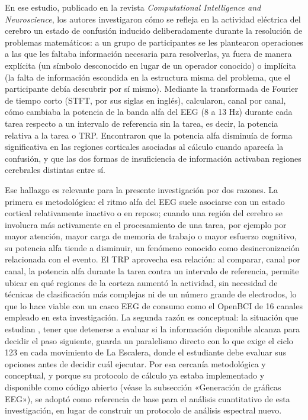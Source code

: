 \documentclass{book}
\begin{document}
En ese estudio, publicado en la revista \textit{Computational Intelligence and Neuroscience}, los autores investigaron cómo se refleja en la actividad eléctrica del cerebro un estado de confusión inducido deliberadamente durante la resolución de problemas matemáticos: a un grupo de participantes se les plantearon operaciones a las que les faltaba información necesaria para resolverlas, ya fuera de manera explícita (un símbolo desconocido en lugar de un operador conocido) o implícita (la falta de información escondida en la estructura misma del problema, que el participante debía descubrir por sí mismo). Mediante la transformada de Fourier de tiempo corto (STFT, por sus siglas en inglés), calcularon, canal por canal, cómo cambiaba la potencia de la banda alfa del EEG (8 a 13 Hz) durante cada tarea respecto a un intervalo de referencia sin la tarea, es decir, la potencia relativa a la tarea o TRP. Encontraron que la potencia alfa disminuía de forma significativa en las regiones corticales asociadas al cálculo cuando aparecía la confusión, y que las dos formas de insuficiencia de información activaban regiones cerebrales distintas entre sí.

Ese hallazgo es relevante para la presente investigación por dos razones. La primera es metodológica: el ritmo alfa del EEG suele asociarse con un estado cortical relativamente inactivo o en reposo; cuando una región del cerebro se involucra más activamente en el procesamiento de una tarea, por ejemplo por mayor atención, mayor carga de memoria de trabajo o mayor esfuerzo cognitivo, su potencia alfa tiende a disminuir, un fenómeno conocido como desincronización relacionada con el evento. El TRP aprovecha esa relación: al comparar, canal por canal, la potencia alfa durante la tarea contra un intervalo de referencia, permite ubicar en qué regiones de la corteza aumentó la actividad, sin necesidad de técnicas de clasificación más complejas ni de un número grande de electrodos, lo que lo hace viable con un casco EEG de consumo como el OpenBCI de 16 canales empleado en esta investigación. La segunda razón es conceptual: la situación que estudian \citet{Liang2018}, tener que detenerse a evaluar si la información disponible alcanza para decidir el paso siguiente, guarda un paralelismo directo con lo que exige el ciclo 123 en cada movimiento de La Escalera, donde el estudiante debe evaluar sus opciones antes de decidir cuál ejecutar. Por esa cercanía metodológica y conceptual, y porque su protocolo de cálculo ya estaba implementado y disponible como código abierto (véase la subsección «Generación de gráficas EEG»), se adoptó como referencia de base para el análisis cuantitativo de esta investigación, en lugar de construir un protocolo de análisis espectral nuevo.
\end{document}
